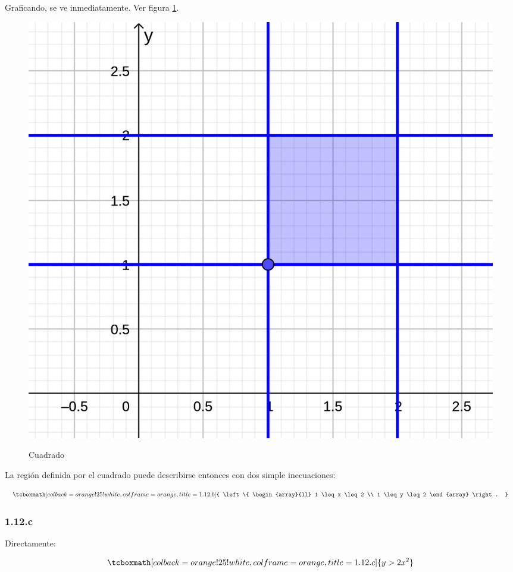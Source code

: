 \documentclass{article}
\begin{document}
Graficando, se ve inmediatamente. Ver figura \ref{fig:1-12-b}.

\begin{figure}[ht]
\caption{Cuadrado}
\includegraphics[scale=1.4]{img/ejercicios/1/12-b.png} 
\centering
\label{fig:1-12-b}
\end{figure}

La región definida por el cuadrado puede describirse entonces con dos simple inecuaciones:

\begin{equation}
\tcboxmath[colback=orange!25!white,colframe=orange,title=1.12.b]
{ \left\{ \begin{array}{ll}
1 \leq x \leq 2 \\
1 \leq y \leq 2
\end{array} \right. }
\end{equation}

\subsubsection*{1.12.c}
\label{subsubsec:1.12.c}

Directamente:

\begin{equation}
\tcboxmath[colback=orange!25!white,colframe=orange,title=1.12.c]
{ y > 2 x^2 }
\end{equation}
\end{document}
